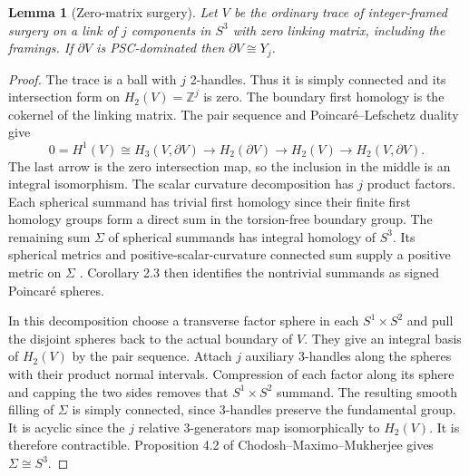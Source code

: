 \documentclass[11pt,letterpaper]{article}
\numberwithin{equation}{section}
\newtheorem{lemma}[theorem]{Lemma}
\theoremstyle{remark}
\begin{document}
\begin{lemma}[Zero-matrix surgery]\label{lem:zero}
Let \(V\) be the ordinary trace of integer-framed surgery on a link
of \(j\) components in \(S^3\) with zero linking matrix, including
the framings. If \(\partial V\) is PSC-dominated then
\(\partial V\cong Y_j\).
\end{lemma}
\begin{proof}
The trace is a ball with \(j\) 2-handles. Thus it is simply connected
and its intersection form on \(H_2(V)=\mathbb Z^j\) is zero.
The boundary first homology is the cokernel of the linking matrix.
The pair sequence and Poincar\'e--Lefschetz duality give
\[
 0=H^1(V)\cong H_3(V,\partial V)\longrightarrow H_2(\partial V)
 \longrightarrow H_2(V)\longrightarrow H_2(V,\partial V).
\]
The last arrow is the zero intersection map, so the inclusion in
the middle is an integral isomorphism. The scalar curvature
decomposition has \(j\) product factors. Each spherical summand
has trivial first homology since their finite first homology
groups form a direct sum in the torsion-free boundary group.
The remaining sum \(\Sigma\) of spherical summands has integral
homology of \(S^3\). Its spherical metrics and positive-scalar-curvature
connected sum supply a positive metric on \(\Sigma\)
\cite[Theorem A]{GromovLawson1980Surgery}.
Corollary 2.3 then identifies the nontrivial summands as signed
Poincar\'e spheres.

In this decomposition choose a transverse factor sphere in each
\(S^1\times S^2\) and pull the disjoint spheres back to the actual
boundary of \(V\). They give an integral basis of \(H_2(V)\) by
the pair sequence. Attach \(j\) auxiliary 3-handles along the
spheres with their product normal intervals. Compression of each
factor along its sphere and capping the two sides removes that
\(S^1\times S^2\) summand. The resulting smooth filling of
\(\Sigma\) is simply connected, since 3-handles preserve the
fundamental group. It is acyclic since the \(j\) relative
3-generators map isomorphically to \(H_2(V)\).
It is therefore contractible. Proposition 4.2 of
Chodosh--Maximo--Mukherjee gives \(\Sigma\cong S^3\).
\end{proof}
\end{document}
